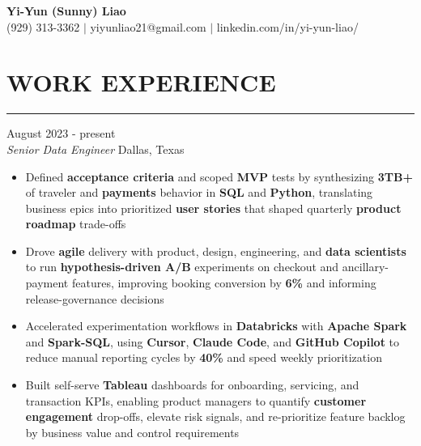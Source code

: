 \documentclass[11pt,letterpaper]{article}
\begin{document}
\begin{center}
  {\Large\textbf{Yi-Yun (Sunny) Liao}}\\[-2pt]
  (929) 313-3362 $|$ yiyunliao21@gmail.com $|$ linkedin.com/in/yi-yun-liao/
\end{center}

\vspace{-2pt}
\section*{WORK EXPERIENCE}
\vspace{-6pt}\noindent\rule{\textwidth}{0.8pt}

\vspace{2pt}
 \hfill August 2023 - present\\[-1pt]
\textit{Senior Data Engineer} \hfill Dallas, Texas
\begin{itemize}[leftmargin=1.5em, rightmargin=0pt, itemsep=-1pt, topsep=-1pt, parsep=0pt]
  \item \justifying Defined \textbf{acceptance criteria} and scoped \textbf{MVP} tests by synthesizing \textbf{3TB+} of traveler and \textbf{payments} behavior in \textbf{SQL} and \textbf{Python}, translating business epics into prioritized \textbf{user stories} that shaped quarterly \textbf{product roadmap} trade-offs
  \item \justifying Drove \textbf{agile} delivery with product, design, engineering, and \textbf{data scientists} to run \textbf{hypothesis-driven A/B} experiments on checkout and ancillary-payment features, improving booking conversion by \textbf{6\%} and informing release-governance decisions
  \item \justifying Accelerated experimentation workflows in \textbf{Databricks} with \textbf{Apache Spark} and \textbf{Spark-SQL}, using \textbf{Cursor}, \textbf{Claude Code}, and \textbf{GitHub Copilot} to reduce manual reporting cycles by \textbf{40\%} and speed weekly prioritization
  \item \justifying Built self-serve \textbf{Tableau} dashboards for onboarding, servicing, and transaction KPIs, enabling product managers to quantify \textbf{customer engagement} drop-offs, elevate risk signals, and re-prioritize feature backlog by business value and control requirements
\end{itemize}
\end{document}
